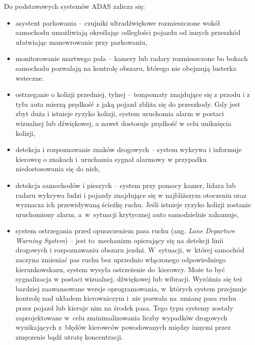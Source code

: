 Do podstawowych systemów ADAS zalicza się:
\begin{itemize}
	\item asystent parkowania -- czujniki ultradźwiękowe rozmieszczone wokół samochodu umożliwiają określając odległości pojazdu od innych przeszkód ułatwiając manewrowanie przy parkowaniu,
	\item monitorowanie martwego pola -- kamery lub radary rozmieszczone bo bokach samochodu pozwalają na kontrolę obszaru, którego nie obejmują lusterka wsteczne.
	\item ostrzeganie o kolizji przedniej, tylnej -- tempomaty znajdujące się z przodu i z tyłu auta mierzą prędkość z jaką pojazd zbliża się do przeszkody. 
	Gdy jest zbyt duża i istnieje ryzyko kolizji, system uruchomia alarm w postaci wizualnej lub dźwiękowej, a nawet dostosuje prędkość w celu uniknięcia kolizji,
	
	\item detekcja i rozpoznawanie znaków drogowych -- system wykrywa i informuje kierowcę o znakach i~uruchamia sygnał alarmowy w przypadku niedostosowania się do nich,
	
	\item detekcja samochodów i pieszych -- system przy pomocy kamer, lidara lub radaru wykrywa ludzi i pojazdy znajdujące się w najbliższym otoczeniu oraz wyznacza ich przewidywaną ścieżkę ruchu. Jeśli istnieje ryzyko kolizji zostanie uruchomiony alarm, a~w~sytuacji krytycznej auto samodzielnie zahamuje,
	
	\item system ostrzegania przed opuszczeniem pasa ruchu (ang. \textit{Lane Departure Warning System}) -- jest to~mechanizm opierający się na detekcji linii drogowych i rozpoznawaniu obszaru jezdni. 
	W~sytuacji, w~której samochód zaczyna zmieniać pas ruchu bez uprzednio włączonego odpowiedniego kierunkowskazu, system wysyła ostrzeżenie do~kierowcy. 
	Może to być sygnalizacja w postaci wizualnej, dźwiękowej lub wibracji. 
	Wyróżnia się też bardziej zaawansowane wersje oprogramowania, w~których system przejmuje kontrolę nad układem kierowniczym i~nie pozwala na~zmianę pasa ruchu przez pojazd lub kieruje nim na środek pasa.
	Tego typu systemy zostały zaprojektowane w~celu zminimalizowania liczby wypadków drogowych wynikających z~błędów kierowców powodowanych między innymi przez zmęczenie bądź utratę koncentracji.
\end{itemize}

